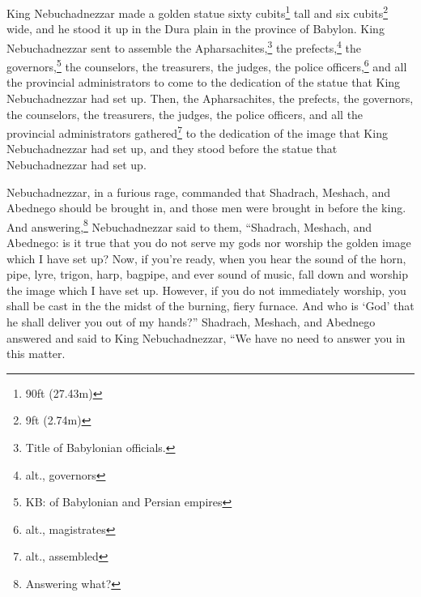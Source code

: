 
\begin{inparaenum}
     King Nebuchadnezzar made a golden statue sixty cubits\footnote{90\thinspace ft (27.43\thinspace m)} tall and six cubits\footnote{9\thinspace ft (2.74\thinspace m)} wide, and he stood it up in the Dura plain in the province of Babylon.%
     King Nebuchadnezzar sent to assemble the Apharsachites,\footnote{Title of Babylonian officials.} the prefects,\footnote{alt., governors} the governors,\footnote{KB: of Babylonian and Persian empires} the counselors, the treasurers, the judges, the police officers,\footnote{alt., magistrates} and all the provincial administrators to come to the dedication of the statue that King Nebuchadnezzar had set up.%
     Then, the Apharsachites, the prefects, the governors, the counselors, the treasurers, the judges, the police officers, and all the provincial administrators gathered\footnote{alt., assembled} to the dedication of the image that King Nebuchadnezzar had set up, and they stood before the statue that Nebuchadnezzar had set up.%
    
    
    
     Nebuchadnezzar, in a furious rage, commanded that Shadrach, Meshach, and Abednego should be brought in, and those men were brought in before the king.%
     And answering,\footnote{Answering what?} Nebuchadnezzar said to them, ``Shadrach, Meshach, and Abednego: is it true that you do not serve my gods nor worship the golden image which I have set up?%
     Now, if you're ready, when you hear the sound of the horn, pipe, lyre, trigon, harp, bagpipe, and ever sound of music, fall down and worship the image which I have set up. However, if you do not immediately worship, you shall be cast in the the midst of the burning, fiery furnace. And who is `God' that he shall deliver you out of my hands?''%
     Shadrach, Meshach, and Abednego answered and said to King Nebuchadnezzar, ``We have no need to answer you in this matter.%
    
    
    
    
\end{inparaenum}
